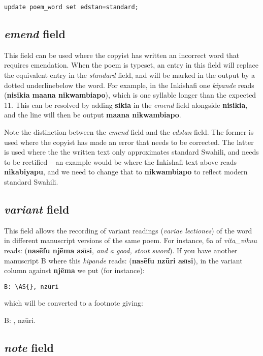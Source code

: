 \verb|update poem_word set edstan=standard;|

\subsection{\textit{emend} field}

This field can be used where the copyist has written an incorrect word that requires emendation.  When the poem is typeset, an entry in this field will replace the equivalent entry in the \textit{standard} field, and will be marked in the output by a dotted underlinebelow the word.  For example, in the Inkishafi one \textit{kipande} reads  (\textbf{nisikia maana nikwambiapo}), which is one syllable longer than the expected 11.  This can be resolved by adding \textbf{sikia} in the \textit{emend} field alongside \textbf{nisikia}, and the line will then be output \textbf{ maana nikwambiapo}.

Note the distinction between the \textit{emend} field and the \textit{edstan} field.  The former is used where the copyist has made an error that needs to be corrected.  The latter is used where the the written text only approximates standard Swahili, and needs to be rectified -- an example would be where the Inkishafi text above reads \textbf{nikabiyapu}, and we need to change that to \textbf{nikwambiapo} to reflect modern standard Swahili.

\subsection{\textit{variant} field}

This field allows the recording of variant readings (\textit{variae lectiones}) of the word in different manuscript versions of the same poem.  For instance, 6a of \textit{vita_vikuu} reads:  (\textbf{nasēfu njēma ası̄si}, \textit{and a good, stout sword}).  If you have another manuscript B where this \textit{kipande} reads:  (\textbf{nasēfu nzūri ası̄si}), in the variant column against \textbf{njēma} we put (for instance):

\verb|B: \AS{|\texttt{}\verb|}, nzūri|

which will be converted to a footnote giving:

B: , nzūri.

\subsection{\textit{note} field}

